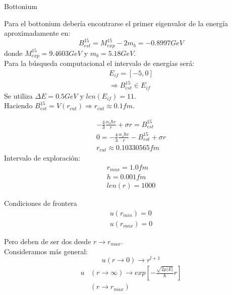 \begin{frame}{Bottonium}

Para el bottonium debería encontrarse el primer eigenvalor de la energía aproximadamente en:
\begin{equation*}
    B^{15}_{est} = M^{15}_{exp}-2m_{b} = -0.8997 GeV
\end{equation*}
donde $M^{15}_{exp}=9.4603 GeV$ y $m_{b}=5.18 GeV$.\\
\vspace{5mm}
Para la búsqueda computacional el intervalo de energías será:
\begin{gather*}
    E_{if} = [-5,0] \\
    \Rightarrow B^{15}_{est} \in E_{if}
\end{gather*}
\vspace{5mm}
Se utiliza $\Delta E=0.5GeV$ y $len(E_{if})=11$.\\
Haciendo $B^{15}_{est}=V(r_{cut}) \Rightarrow r_{cut} \approx 0.1fm$.
    
\end{frame}

\begin{frame}{}

\begin{gather*}
    -\frac{4}{3}\frac{\alpha_{s}\hbar c}{r} +\sigma r = B^{15}_{est} \\
    0 = -\frac{4}{3}\frac{\alpha_{s}\hbar c}{r} - B^{15}_{est} + \sigma r \\
    r_{cut} \approx 0.10330565fm
\end{gather*}
\vspace{5mm}
Intervalo de exploración:
\begin{gather*}
    r_{max} = 1.0fm \\
    h = 0.001fm \\
    len(r) = 1000
\end{gather*}
    
\end{frame}

\begin{frame}{Condiciones de frontera}
\begin{gather*}
    u(r_{min}) = 0 \\
    u(r_{max}) = 0
\end{gather*}

Pero deben de ser dos desde $r\rightarrow r_{max}$.\\
Consideramos más general:
\begin{equation*}
    u(r\rightarrow 0) \rightarrow r^{l+1}
\end{equation*}
\begin{align*}
    u&(r\rightarrow \infty) \rightarrow exp\left[ -\frac{\sqrt{2\mu |E|}}{\hbar}r \right] \\
    &(r\rightarrow r_{max})
\end{align*}
    
\end{frame}